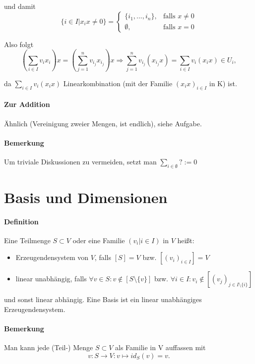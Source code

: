 	und damit 
	\begin{equation*}
		\{i\in I| x_ix\neq 0\} =
		\begin{cases}
			\{{i_1,...,i_n\}},& \text{falls }x \neq 0\\
			\emptyset,& \text{falls }x = 0
		\end{cases}
	\end{equation*}

	Also folgt
	\begin{equation*}
		(\sum_{i\in I}v_i x_i) x = (\sum_{j=1}^{n} v_{i_j}x_{i_j})x \Rightarrow \sum_{j=1}^{n} v_{i_j}(x_{i_j}x) = \sum_{i\in I} v_i(x_ix) \in U_i,
	\end{equation*}

	da $\sum_{i\in I} v_i(x_ix)$ Linearkombination (mit der Familie $(x_ix)_{i\in I}$ in K) ist.

\paragraph{Zur Addition}
	Ähnlich (Vereinigung zweier Mengen, ist endlich), siehe Aufgabe.
\paragraph{Bemerkung}
	Um triviale Diskussionen zu vermeiden, setzt man $\sum_{i\in \emptyset} ?:=0$

\section{Basis und Dimensionen}

\paragraph{Definition}
	Eine Teilmenge $S\subset V$ oder eine Familie $(v_i| i\in I)$ in $ V $ heißt:
	\begin{itemize}
		\item Erzeugendensystem von $ V $, falls $[S] = V$ bzw. $[(v_i)_{i\in I}] = V$
		\item linear unabhängig, falls $\forall v\in S: v \notin [S\setminus\{{v\}}]$ bzw. $\forall i\in I: v_i \notin [(v_j)_{j\in I\setminus\{{i\}}}]$
	\end{itemize}

	und sonst linear abhängig. Eine Basis ist ein linear unabhängiges Erzeugendensystem.

\paragraph{Bemerkung}
	Man kann jede (Teil-) Menge $S\subset V$ als Familie in V auffassen mit
	\begin{equation*}
		v: S \to V: v\mapsto id_S(v) = v.
	\end{equation*}
	
